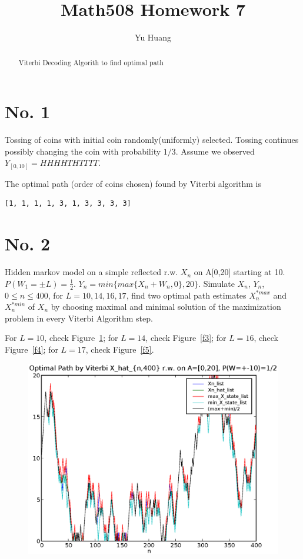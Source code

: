 \documentclass[a4paper,10pt]{article}
\title{Math508 Homework 7}
\author{Yu Huang}
\begin{document}
\maketitle

\begin{abstract}
Viterbi Decoding Algorith to find optimal path
\end{abstract}

\section{No. 1}
Tossing of coins with initial coin randomly(uniformly) selected. Tossing continues possibly changing the coin with probability $1/3$. Assume we observed $Y_{[0,10]} = HHHHTHTTTT$.

The optimal path (order of coins chosen) found by Viterbi algorithm is 
\begin{verbatim}
[1, 1, 1, 1, 3, 1, 3, 3, 3, 3]
\end{verbatim}


\section{No. 2}
Hidden markov model on a simple reflected r.w. $X_n$ on A[0,20] starting at 10. $P(W_1 = \pm L) = \frac{1}{2}$. $Y_n = min\{max\{X_n+W_n, 0\}, 20\}$. Simulate $X_n$, $Y_n$, $0 \le n \le 400$, for $L=10,14,16,17$, find two optimal path estimates $X^{\ast max}_n$ and $X^{\ast min}_n$ of $X_n$ by choosing maximal and minimal solution of the maximization problem in every Viterbi Algorithm step.

For $L=10$, check Figure~\ref{f2}; for $L=14$, check Figure~\ref{f3}; for $L=16$, check Figure~\ref{f4}; for $L=17$, check Figure~\ref{f5}.

\begin{figure}[p]
\includegraphics[width=1\textwidth]{hw7_2_K_20_L_10_T_400.eps}
\caption{}\label{f2}
\end{figure}
\end{document}
